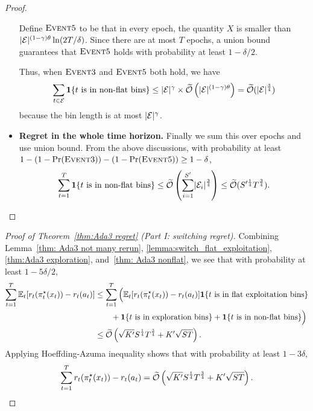 \begin{proof}
\begin{itemize}[leftmargin=*]
Define $\textsc{Event} 5$ to be that in every epoch, the quantity $X$ is smaller than $\lvert{\mathcal{E}}\rvert^{(1-\gamma)\theta}\ln(2T/\delta)$. Since there are at most $T$ epochs, a union bound guarantees that $\textsc{Event} 5$ holds with probability at least $1-\delta/2$. 

Thus, when $\textsc{Event} 3$ and $\textsc{Event} 5$ both hold, we have
\begin{align*}
\sum_{t\in{\mathcal{E}}} \boldsymbol{1}\{ t \text{ is in non-flat bins} \} \leq \lvert{\mathcal{E}}\rvert^{\gamma} \times \widetilde{\mathcal{O}}\left(\lvert{\mathcal{E}}\rvert^{(1-\gamma)\theta}\right)=\widetilde{\mathcal{O}}(\lvert{\mathcal{E}}\rvert^{\frac{3}{4}}) 
\end{align*}
because the bin length is at most $\lvert{\mathcal{E}}\rvert^{\gamma}$. 

\item \textbf{Regret in the whole time horizon.}
Finally we sum this over epochs and use union bound. From the above discussions, with probability at least $1-(1-\text{Pr}(\textsc{Event} 3))-(1-\text{Pr}(\textsc{Event} 5))\geq 1-\delta$, 
\begin{align*}
\sum_{t=1}^T \boldsymbol{1}\{ t \text{ is in non-flat bins} \}\leq \widetilde{\mathcal{O}}\left(\sum_{i=1}^{S^\prime}\lvert{\mathcal{E}}_i\rvert^{\frac{3}{4}}\right)\leq \widetilde{\mathcal{O}}(S^{\prime \frac{1}{4}}T^{\frac{3}{4}}). 
\end{align*}
\end{itemize}
\end{proof}

\begin{proof}[Proof of Theorem~\ref{thm:Ada3 regret} (Part I: switching regret)]
Combining Lemma~\ref{thm: Ada3 not many rerun}, \ref{lemma:switch_flat_exploitation}, \ref{thm:Ada3 exploration}, and~\ref{thm: Ada3 nonflat}, we see that with probability at least $1-5\delta/2$, 
\begin{align*}
\sum_{t=1}^T \mathbb{E}_t[r_t(\pi^\star_t(x_t)) - r_t(a_t)]
&\leq \sum_{t=1}^T \Big( \mathbb{E}_t[r_t(\pi^\star_t(x_t)) - r_t(a_t)] \boldsymbol{1}\{t \text{ is in flat exploitation bins}\}  \\
&\qquad+ \boldsymbol{1}\{t \text{ is in exploration bins}\} + \boldsymbol{1}\{ t \text{ is in non-flat bins} \}  \Big) \\
&\leq \widetilde{\mathcal{O}}\left(\sqrt{K^\prime}S^{\frac{1}{4}}T^{\frac{3}{4}}  + K^\prime\sqrt{S T}\right). 
\end{align*}
Applying Hoeffding-Azuma inequality shows that with probability at least $1-3\delta$, 
\[
\sum_{t=1}^T r_t(\pi^\star_t(x_t)) - r_t(a_t) = \widetilde{\mathcal{O}}\left(\sqrt{K^\prime}S^{\frac{1}{4}}T^{\frac{3}{4}}  + K^\prime\sqrt{S T}\right).
\]
\end{proof}

